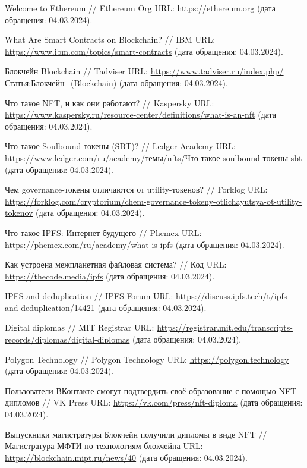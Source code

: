 \begin{thebibliography}{99\kern\bibindent}
	 Welcome to Ethereum // Ethereum Org URL: \url{https://ethereum.org} (дата обращения: 04.03.2024).

	 What Are Smart Contracts on Blockchain? // IBM URL: \url{https://www.ibm.com/topics/smart-contracts} (дата обращения: 04.03.2024).

	 Блокчейн
	Blockchain // Tadviser URL: \url{https://www.tadviser.ru/index.php/Статья:Блокчейн_(Blockchain)} (дата обращения: 04.03.2024).

	 Что такое NFT, и как они работают? // Kaspersky URL: \url{https://www.kaspersky.ru/resource-center/definitions/what-is-an-nft} (дата обращения: 04.03.2024).

	 Что такое Soulbound-токены (SBT)? // Ledger Academy URL: \url{https://www.ledger.com/ru/academy/темы/nfts/Что-такое-soulbound-токены-sbt} (дата обращения: 04.03.2024).

	 Чем governance-токены отличаются от utility-токенов? // Forklog URL: \url{https://forklog.com/cryptorium/chem-governance-tokeny-otlichayutsya-ot-utility-tokenov} (дата обращения: 04.03.2024).

	 Что такое IPFS: Интернет будущего // Phemex URL: \url{https://phemex.com/ru/academy/what-is-ipfs} (дата обращения: 04.03.2024).

	 Как устроена межпланетная файловая система? // Код URL: \url{https://thecode.media/ipfs} (дата обращения: 04.03.2024).

	 IPFS and deduplication // IPFS Forum URL: \url{https://discuss.ipfs.tech/t/ipfs-and-deduplication/14421} (дата обращения: 04.03.2024).

	 Digital diplomas // MIT Registrar URL: \url{https://registrar.mit.edu/transcripts-records/diplomas/digital-diplomas} (дата обращения: 04.03.2024).

	 Polygon Technology // Polygon Technology URL: \url{https://polygon.technology} (дата обращения: 04.03.2024).
	
	 Пользователи ВКонтакте смогут подтвердить своё образование с помощью NFT-дипломов // VK Press URL: \url{https://vk.com/press/nft-diploma} (дата обращения: 04.03.2024).

	 Выпускники магистратуры Блокчейн получили дипломы в виде NFT // Магистратура МФТИ по технологиям блокчейна URL: \url{https://blockchain.mipt.ru/news/40} (дата обращения: 04.03.2024).


\end{thebibliography}
